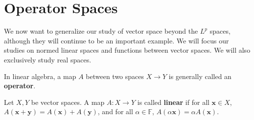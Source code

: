 \documentclass[11pt, letterpaper]{report}
\begin{document}
\section{Operator Spaces}
We now want to generalize our study of vector space beyond the $L^p$ spaces, although they will continue to be an important example. We will focus our studies on normed linear spaces and functions between vector spaces. We will also exclusively study real spaces.

In linear algebra, a map $A$ between two spaces $X\to Y$ is generally called an \textbf{operator}.
\begin{definition}\label{dfn:2.10}
	Let $X,Y$ be vector spaces. A map $A : X \to Y$ is called \textbf{linear} if for all $\mathbf{x}\in X$, $A\left( \mathbf{x}+\mathbf{y} \right) =A(\mathbf{x})+A(\mathbf{y})$, and for all $\alpha \in \mathbb{F}$, $A(\alpha \mathbf{x})=\alpha A(\mathbf{x})$.
\end{definition}
\end{document}

